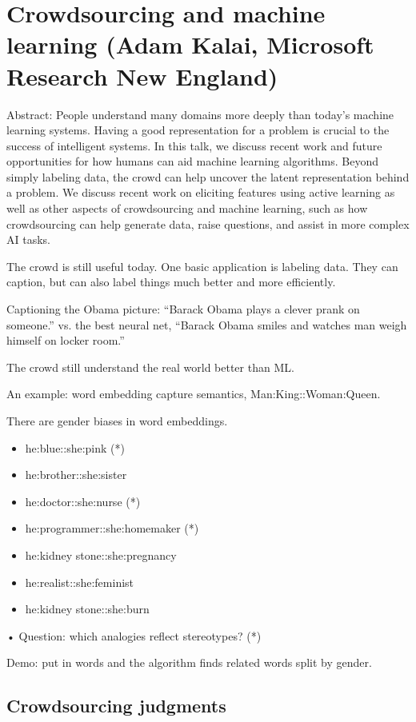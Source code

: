 \section{Crowdsourcing and machine learning (Adam Kalai, Microsoft Research New England)} 

Abstract: People understand many domains more deeply than today's machine learning systems. Having a good representation for a problem is crucial to the success of intelligent systems. In this talk, we discuss recent work and future opportunities for how humans can aid machine learning algorithms. Beyond simply labeling data, the crowd can help uncover the latent representation behind a problem. We discuss recent work on eliciting features using active learning as well as other aspects of crowdsourcing and machine learning, such as how crowdsourcing can help generate data, raise questions, and assist in more complex AI tasks.

The crowd is still useful today. One basic application is labeling data. They can caption, but can also label things much better and more efficiently.


Captioning the Obama picture: 
``Barack Obama plays a clever prank on someone.'' vs. the best neural net, ``Barack Obama smiles and watches man weigh himself on locker room.''

The crowd still understand the real world better than ML.

An example: word embedding capture semantics, Man:King::Woman:Queen. 

There are gender biases in word embeddings.
\begin{itemize}
\item
he:blue::she:pink (*)
\item
he:brother::she:sister
\item
he:doctor::she:nurse (*)
\item
he:programmer::she:homemaker (*)
\item
he:kidney stone::she:pregnancy
\item
he:realist::she:feminist
\item
he:kidney stone::she:burn
\end{itemize}•
Question: which analogies reflect stereotypes? (*)

Demo: put in words and the algorithm finds related words split by gender.

\subsection{Crowdsourcing judgments}


